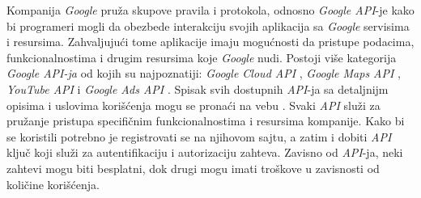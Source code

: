 \documentclass[android.tex]{subfiles}
\begin{document}
Kompanija \textit{Google} pruža skupove pravila i protokola, odnosno \textit{Google API}-je kako bi programeri mogli da obezbede interakciju svojih aplikacija sa \textit{Google} servisima i resursima. Zahvaljujući tome aplikacije imaju mogućnosti da pristupe podacima, funkcionalnostima i drugim resursima koje \textit{Google} nudi. Postoji više kategorija \textit{Google API-ja} od kojih su najpoznatiji: \textit{Google Cloud API} \cite{sajt:googleCloudApis}, \textit{Google Maps API} \cite{sajt:googleMaps}, \textit{YouTube API} \cite{sajt:youtubeApis} i \textit{Google Ads API} \cite{sajt:googleAds}. Spisak svih dostupnih \textit{API}-ja sa detaljnijm opisima i uslovima korišćenja mogu se pronaći na vebu \cite{sajt:googleApiSpisak}. Svaki \textit{API} služi za pružanje pristupa specifičnim funkcionalnostima i resursima kompanije. Kako bi se koristili potrebno je registrovati se na njihovom sajtu, a zatim i dobiti \textit{API} ključ koji služi za autentifikaciju i autorizaciju zahteva. Zavisno od \textit{API}-ja, neki zahtevi mogu biti besplatni, dok drugi mogu imati troškove u zavisnosti od količine korišćenja.  
\end{document}
